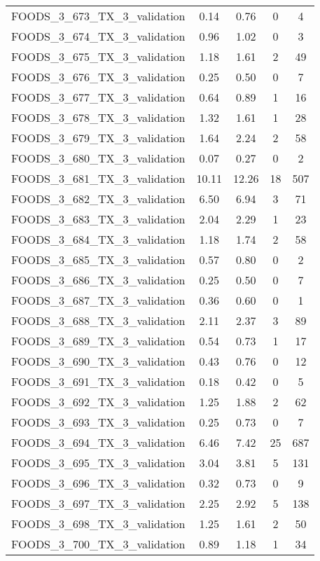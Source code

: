 \begin{table}
\begin{tabular}{|l|c|c|c|c|}
FOODS\_3\_673\_TX\_3\_validation & 0.14 & 0.76 & 0 & 4 \\
FOODS\_3\_674\_TX\_3\_validation & 0.96 & 1.02 & 0 & 3 \\
FOODS\_3\_675\_TX\_3\_validation & 1.18 & 1.61 & 2 & 49 \\
FOODS\_3\_676\_TX\_3\_validation & 0.25 & 0.50 & 0 & 7 \\
FOODS\_3\_677\_TX\_3\_validation & 0.64 & 0.89 & 1 & 16 \\
FOODS\_3\_678\_TX\_3\_validation & 1.32 & 1.61 & 1 & 28 \\
FOODS\_3\_679\_TX\_3\_validation & 1.64 & 2.24 & 2 & 58 \\
FOODS\_3\_680\_TX\_3\_validation & 0.07 & 0.27 & 0 & 2 \\
FOODS\_3\_681\_TX\_3\_validation & 10.11 & 12.26 & 18 & 507 \\
FOODS\_3\_682\_TX\_3\_validation & 6.50 & 6.94 & 3 & 71 \\
FOODS\_3\_683\_TX\_3\_validation & 2.04 & 2.29 & 1 & 23 \\
FOODS\_3\_684\_TX\_3\_validation & 1.18 & 1.74 & 2 & 58 \\
FOODS\_3\_685\_TX\_3\_validation & 0.57 & 0.80 & 0 & 2 \\
FOODS\_3\_686\_TX\_3\_validation & 0.25 & 0.50 & 0 & 7 \\
FOODS\_3\_687\_TX\_3\_validation & 0.36 & 0.60 & 0 & 1 \\
FOODS\_3\_688\_TX\_3\_validation & 2.11 & 2.37 & 3 & 89 \\
FOODS\_3\_689\_TX\_3\_validation & 0.54 & 0.73 & 1 & 17 \\
FOODS\_3\_690\_TX\_3\_validation & 0.43 & 0.76 & 0 & 12 \\
FOODS\_3\_691\_TX\_3\_validation & 0.18 & 0.42 & 0 & 5 \\
FOODS\_3\_692\_TX\_3\_validation & 1.25 & 1.88 & 2 & 62 \\
FOODS\_3\_693\_TX\_3\_validation & 0.25 & 0.73 & 0 & 7 \\
FOODS\_3\_694\_TX\_3\_validation & 6.46 & 7.42 & 25 & 687 \\
FOODS\_3\_695\_TX\_3\_validation & 3.04 & 3.81 & 5 & 131 \\
FOODS\_3\_696\_TX\_3\_validation & 0.32 & 0.73 & 0 & 9 \\
FOODS\_3\_697\_TX\_3\_validation & 2.25 & 2.92 & 5 & 138 \\
FOODS\_3\_698\_TX\_3\_validation & 1.25 & 1.61 & 2 & 50 \\
FOODS\_3\_700\_TX\_3\_validation & 0.89 & 1.18 & 1 & 34 \\

\end{tabular}
\end{table}

